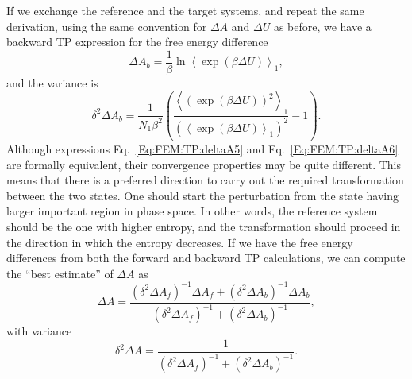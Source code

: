 If we exchange the reference and the target systems, and repeat the same derivation, using the same convention for $\Delta A$ and $\Delta U$ as before, we have a backward TP expression for the free energy difference
\begin{equation}
  \Delta A_b = \frac{1}{\beta} \ln{ \left \langle \exp(\beta \Delta U) \right \rangle_{1}},
  \label{Eq:FEM:TP:deltaA6}
\end{equation}
and the variance is
\begin{equation}
  \delta^2 \Delta A_b=\frac{1}{N_1\beta^2}\left(\frac{\left<(\exp(\beta \Delta U))^2\right>_1}{\left(\left<\exp(\beta \Delta U)\right>_1\right)^2}-1\right).
\end{equation}
Although expressions Eq.~\ref{Eq:FEM:TP:deltaA5} and Eq.~\ref{Eq:FEM:TP:deltaA6} are formally equivalent, their convergence properties may be quite different. This means that there is a preferred direction to carry out the required transformation between the two states. One should start the perturbation from the state having larger important region in phase space. In other words, the reference system should be the one with higher entropy, and the transformation should proceed in the direction in which the entropy decreases. If we have the free energy differences from both the forward and backward TP calculations, we can compute the ``best estimate'' of $\Delta A$ as
\begin{equation}
    \Delta A = \frac{(\delta^2 \Delta A_f)^{-1}\Delta A_f+(\delta^2 \Delta A_b)^{-1}\Delta A_b}{(\delta^2 \Delta A_f)^{-1}+(\delta^2 \Delta A_b)^{-1}},
\end{equation} 
with variance
\begin{equation}
    \delta^2 \Delta A=\frac{1}{(\delta^2 \Delta A_f)^{-1}+(\delta^2 \Delta A_b)^{-1}}.
\end{equation} 

